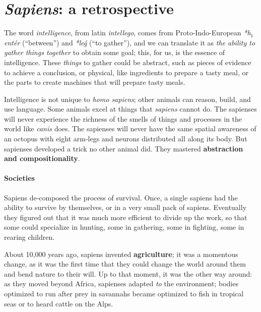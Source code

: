 

\section{\emph{Sapiens}: a retrospective}
\label{sub:brief-history}

The word \emph{intelligence}, from latin \emph{intellego}, comes from Proto-Indo-European  \emph{*h${}_1$entér} (``between'') and \emph{*leǵ} (``to gather''), and we can translate it as \emph{the ability to gather things together} to obtain some goal; this, for us, is the essence of intelligence.
These \emph{things} to gather could be abstract, such as pieces of evidence to achieve a conclusion, or physical, like ingredients to prepare a tasty meal, or the parts to create machines that will prepare tasty meals.

Intelligence is not unique to \emph{homo sapiens}; other animals can reason, build, and use language.
Some animals excel at things that \emph{sapiens} cannot do.
The sapienses will never experience the richness of the smells of things and processes in the world like \emph{canis} does.
The sapienses will never have the same spatial awareness of an octopus with eight arm-legs and neurons distributed all along its body.
But sapienses developed a trick no other animal did.
They mastered \textbf{abstraction and compositionality}.

\paragraph{Societies}

Sapiens de-composed the process of survival.
Once, a single sapiens had the ability to survive by themselves, or in a very small pack of sapiens.
Eventually they figured out that it was much more efficient to divide up the work, so that some could specialize in hunting, some in gathering, some in fighting, some in rearing children.

About 10,000 years ago, sapiens invented \textbf{agriculture}; it was a momentous change, as it was the first time that they could change the world around them and bend nature to their will.
Up to that moment, it was the other way around: as they moved beyond Africa, sapienses adapted \emph{to} the environment; bodies optimized to run after prey in savannahs became optimized to fish in tropical seas or to heard cattle on the Alps.

